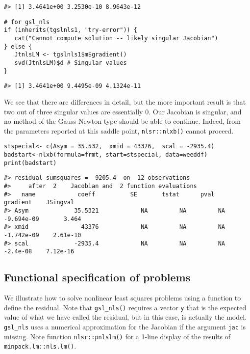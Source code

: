 \begin{verbatim}
#> [1] 3.4641e+00 3.2530e-10 8.9643e-12
\end{verbatim}

\begin{verbatim}
# for gsl_nls
if (inherits(tgslnls1, "try-error")) {
   cat("Cannot compute solution -- likely singular Jacobian")
} else {  
   JtnlsLM <- tgslnls1$m$gradient()
   svd(JtnlsLM)$d # Singular values
}   
\end{verbatim}

\begin{verbatim}
#> [1] 3.4641e+00 9.4495e-09 4.1324e-11
\end{verbatim}

We see that there are differences in detail, but the more important result is that
two out of three singular values are essentially 0. Our Jacobian is singular, and no
method of the Gauss-Newton type should be able to continue. Indeed, from the parameters
reported at this saddle point, \texttt{nlsr::nlxb()} cannot proceed.

\begin{verbatim}
stspecial<- c(Asym = 35.532,  xmid = 43376,  scal = -2935.4)
badstart<-nlxb(formula=frmt, start=stspecial, data=weeddf)
print(badstart)
\end{verbatim}

\begin{verbatim}
#> residual sumsquares =  9205.4  on  12 observations
#>     after  2    Jacobian and  2 function evaluations
#>   name            coeff          SE       tstat      pval      gradient    JSingval   
#> Asym             35.5321            NA         NA         NA  -9.694e-09       3.464  
#> xmid               43376            NA         NA         NA  -1.742e-09    2.61e-10  
#> scal             -2935.4            NA         NA         NA    -2.4e-08    7.12e-16
\end{verbatim}

\hypertarget{functional-specification-of-problems}{%
\subsection{Functional specification of problems}\label{functional-specification-of-problems}}

We illustrate how to solve nonlinear least squares problems using
a function to define the residual. Note that \texttt{gsl\_nls()} requires
a vector \texttt{y} that is the expected value of what we have called the
residual, but in this case, is actually the model. \texttt{gsl\_nls} uses
a numerical approximation for the Jacobian if the argument \texttt{jac}
is missing. Note function \texttt{nlsr::pnlslm()} for a 1-line display of
the results of \texttt{minpack.lm::nls.lm()}.


